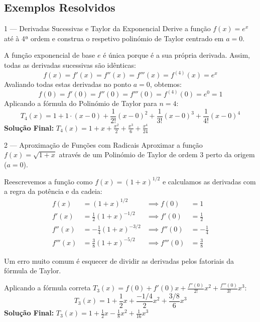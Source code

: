 \subsection{Exemplos Resolvidos}

\begin{exbox}{1 --- Derivadas Sucessivas e Taylor da Exponencial}
  Derive a função $f(x)=e^x$ até à 4ª ordem e construa o respetivo polinómio de Taylor centrado em $a=0$.
\end{exbox}
\begin{solbox}
  A função exponencial de base $e$ é única porque é a sua própria derivada. Assim, todas as derivadas sucessivas são idênticas:
  \[
    f(x) = f'(x) = f''(x) = f'''(x) = f^{(4)}(x) = e^x
  \]
  Avaliando todas estas derivadas no ponto $a=0$, obtemos:
  \[
    f(0) = f'(0) = f''(0) = f'''(0) = f^{(4)}(0) = e^0 = 1
  \]
  Aplicando a fórmula do Polinómio de Taylor para $n=4$:
  \[
    T_4(x) = 1 + 1\cdot(x-0) + \frac{1}{2!}(x-0)^2 + \frac{1}{3!}(x-0)^3 + \frac{1}{4!}(x-0)^4
  \]
  \textbf{Solução Final:} $\boxed{T_4(x) = 1 + x + \frac{x^2}{2} + \frac{x^3}{6} + \frac{x^4}{24}}$
\end{solbox}

\begin{exbox}{2 --- Aproximação de Funções com Radicais}
  Aproximar a função $f(x) = \sqrt{1+x}$ através de um Polinómio de Taylor de ordem 3 perto da origem ($a=0$).
\end{exbox}
\begin{solbox}
  Reescrevemos a função como $f(x) = (1+x)^{1/2}$ e calculamos as derivadas com a regra da potência e da cadeia:
  \begin{align*}
      f(x)   &= (1+x)^{1/2} & \implies f(0) &= 1 \\
      f'(x)  &= \frac{1}{2}(1+x)^{-1/2} & \implies f'(0) &= \frac{1}{2} \\
      f''(x) &= -\frac{1}{4}(1+x)^{-3/2} & \implies f''(0) &= -\frac{1}{4} \\
      f'''(x)&= \frac{3}{8}(1+x)^{-5/2} & \implies f'''(0) &= \frac{3}{8}
  \end{align*}
  \begin{warnbox}[title={Atenção aos Fatoriais!}]
    Um erro muito comum é esquecer de dividir as derivadas pelos fatoriais da fórmula de Taylor.
  \end{warnbox}
  Aplicando a fórmula correta $T_3(x) = f(0) + f'(0)x + \frac{f''(0)}{2!}x^2 + \frac{f'''(0)}{3!}x^3$:
  \[
    T_3(x) = 1 + \frac{1}{2}x + \frac{-1/4}{2}x^2 + \frac{3/8}{6}x^3
  \]
  \textbf{Solução Final:} $\boxed{T_3(x) = 1 + \frac{1}{2}x - \frac{1}{8}x^2 + \frac{1}{16}x^3}$
\end{solbox}


